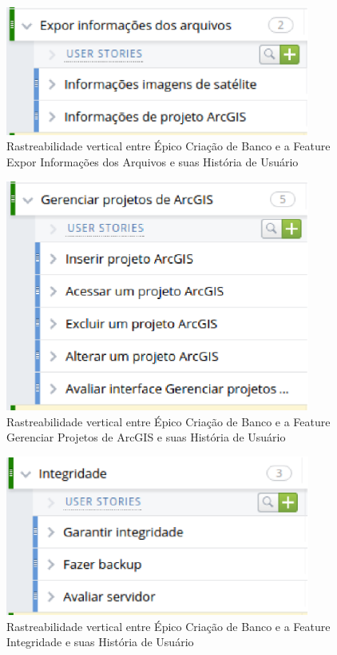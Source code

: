   \begin{figure}[!htb]
    \centering
    \includegraphics[width=10cm, keepaspectratio=false]{figuras/rastreabilidade/vertical/feature_expor.eps}
    \caption{Rastreabilidade vertical entre Épico Criação de Banco e a Feature Expor Informações dos Arquivos e suas História de Usuário}
  \end{figure}

  \begin{figure}[!htb]
    \centering
    \includegraphics[width=10cm, keepaspectratio=false]{figuras/rastreabilidade/vertical/feature_gerenciar_projeto.eps}
    \caption{Rastreabilidade vertical entre Épico Criação de Banco e a Feature Gerenciar Projetos de ArcGIS e suas História de Usuário}
  \end{figure}

  \begin{figure}[!htb]
    \centering
    \includegraphics[width=10cm, keepaspectratio=false]{figuras/rastreabilidade/vertical/feature_integridade.eps}
    \caption{Rastreabilidade vertical entre Épico Criação de Banco e a Feature Integridade e suas História de Usuário}
  \end{figure}




